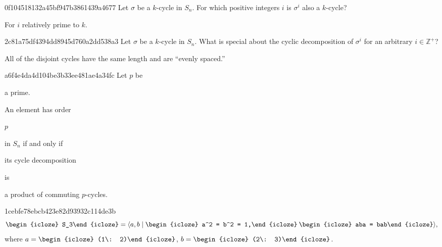 \begin{note}{0f104518132a45bf947b3861439a4677}
    Let \({ \sigma }\) be a \({ k }\)-cycle in \({ S_n }\).
    For which positive integers \({ i }\) is \({ \sigma^{i} }\) also a \({ k }\)-cycle?

    \begin{cloze}{1}
        For \({ i }\) relatively prime to \({ k }\).
    \end{cloze}
\end{note}

\begin{note}{2c81a75df4394dd8945d760a2dd538a3}
    Let \({ \sigma }\) be a \({ k }\)-cycle in \({ S_n }\).
    What is special about the cyclic decomposition of \({ \sigma^{i} }\) for an arbitrary \({ i \in \mathbb Z^{+} }\)?

    \begin{cloze}{1}
        All of the disjoint cycles have the same length and are ``evenly spaced.''
    \end{cloze}
\end{note}

\begin{note}{a6f4e4da4d104be3b33ee481ae4a34fc}
    Let \({ p }\) be \begin{icloze}{3}a prime.\end{icloze} An element has order \begin{icloze}{2}\({ p }\)\end{icloze} in \({ S_n }\) if and only if \begin{icloze}{4}its cycle decomposition\end{icloze} is \begin{icloze}{1}a product of commuting \({ p }\)-cycles.\end{icloze}
\end{note}

\begin{note}{1cebfe78ebcb423e82d93932c114de3b}
    \[
        \begin{icloze}{4}S_3\end{icloze} = \langle a, b \mid \begin{icloze}{1}a^2 = b^2 = 1,\end{icloze}\: \begin{icloze}{2}aba = bab\end{icloze} \rangle,
    \]
    where \({ a = \begin{icloze}{3}(1\: 2)\end{icloze} }\), \({ b = \begin{icloze}{3}(2\: 3)\end{icloze} }\).
\end{note}

